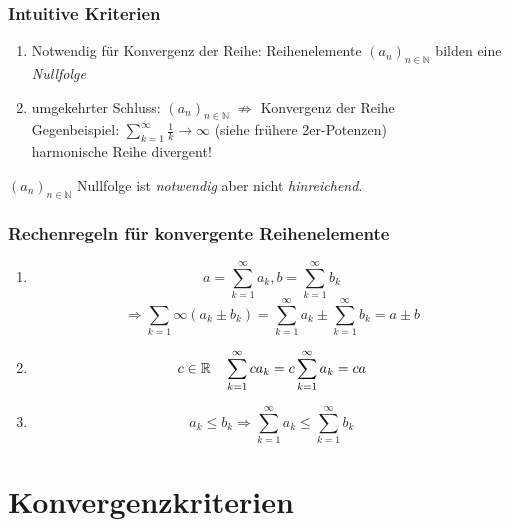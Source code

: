 \subsubsection*{Intuitive Kriterien}

\begin{enumerate}
    \item Notwendig für Konvergenz der Reihe: Reihenelemente $(a_n)_{n \in \mathbb{N}}$ bilden eine \emph{Nullfolge}
    \item umgekehrter Schluss: $(a_n)_{n \in \mathbb{N}}$ $\not\Rightarrow$ Konvergenz der Reihe\\
        Gegenbeispiel: $\sum_{k=1}^{\infty} \frac{1}{k} \rightarrow \infty $ (siehe frühere 2er-Potenzen) \\
        harmonische Reihe divergent!
\end{enumerate}

\begin{note}
    $(a_n)_{n \in \mathbb{N}}$ Nullfolge ist \emph{notwendig} aber nicht \emph{hinreichend}.
\end{note}

\subsubsection*{Rechenregeln für konvergente Reihenelemente}
\begin{enumerate}
    \item \begin{equation*} a = \sum_{k=1}^{\infty} a_k, b = \sum_{k=1}^{\infty} b_k \end{equation*}
        \begin{equation*}\Rightarrow \sum_{k = 1}{\infty} \left( a_k \pm b_k \right) = \sum_{k=1}^{\infty} a_k \pm \sum_{k=1}^{\infty} b_k = a \pm b
        \end{equation*}
    \item \begin{equation*}c \in \mathbb{R} \hspace{10px} \sum_{k=1}^{\infty} c a_k = c \sum_{k=1}^{\infty} a_k = c a \end{equation*}
    \item \begin{equation*}a_k \leq b_k \Rightarrow \sum_{k=1}^{\infty} a_k \leq \sum_{k=1}^{\infty} b_k \end{equation*}
\end{enumerate}

\section{Konvergenzkriterien}

